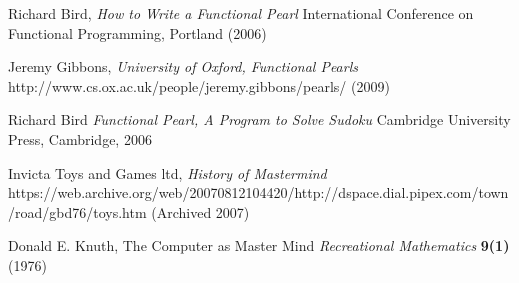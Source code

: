 \documentclass[12pt]{article}  %
\theoremstyle{definition}
\theoremstyle{remark}
\begin{document}
%
%
%
\begin{thebibliography}{99}

% 
%



%

%




Richard Bird,
{\em How to Write a Functional Pearl}
International Conference on Functional Programming, Portland
(2006)

Jeremy Gibbons,
{\em University of Oxford, Functional Pearls}
http://www.cs.ox.ac.uk/people/jeremy.gibbons/pearls/
(2009)

Richard Bird
{\em Functional Pearl, A Program to Solve Sudoku}
Cambridge University Press, Cambridge, 2006

Invicta Toys and Games ltd,
{\em History of Mastermind}
https://web.archive.org/web/20070812104420/http://dspace.dial.pipex.com/town/road/gbd76/toys.htm
(Archived 2007)

Donald E. Knuth,
The Computer as Master Mind
{\em Recreational Mathematics}
{\bf 9(1)}
(1976)

\end{thebibliography}
\end{document}
